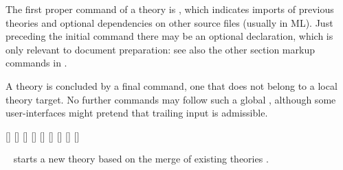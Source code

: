 \begin{isabellebody}
\begin{isamarkuptext}
  The first proper command of a theory is \hyperlink{command.theory}{\mbox{}}, which
  indicates imports of previous theories and optional dependencies on
  other source files (usually in ML).  Just preceding the initial
  \hyperlink{command.theory}{\mbox{}} command there may be an optional \hyperlink{command.header}{\mbox{}} declaration, which is only relevant to document
  preparation: see also the other section markup commands in
  .

  A theory is concluded by a final \hyperlink{command.global.end}{\mbox{}} command,
  one that does not belong to a local theory target.  No further
  commands may follow such a global \hyperlink{command.global.end}{\mbox{}},
  although some user-interfaces might pretend that trailing input is
  admissible.

  \begin{railoutput}
[]
[]
[]
\rail@plus
{}[]
\rail@endplus
\rail@bar
{}
[]
\rail@endbar
{}[]
\rail@end
{}
[]
\rail@plus
\rail@bar
{}[]
[]
\rail@endbar
{}
\rail@endplus
\rail@end
\end{railoutput}


  \begin{description}

  \item \hyperlink{command.theory}{\mbox{}}~
  starts a new theory  based on the merge of existing
  theories .
  

\end{description}
\end{isamarkuptext}
\end{isabellebody}
